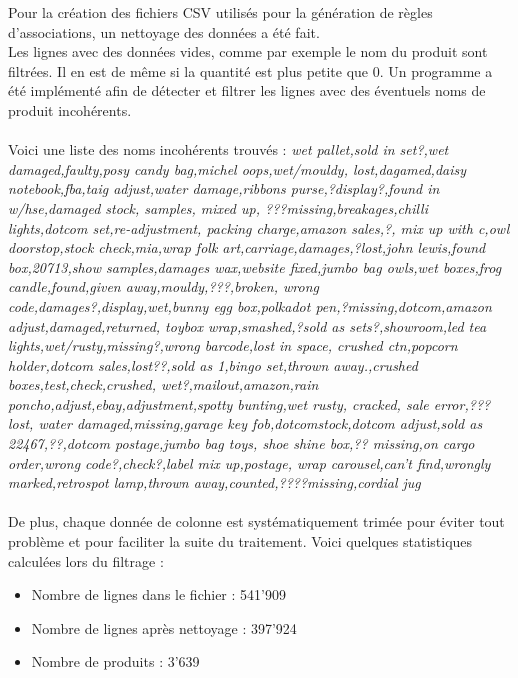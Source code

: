 \documentclass[a4paper]{article}
\begin{document}
\vspace{6pt}
Pour la création des fichiers CSV utilisés pour la génération de règles d'associations, un nettoyage des données a été fait.
\\
Les lignes avec des données vides, comme par exemple le nom du produit sont filtrées.
Il en est de même si la quantité est plus petite que 0.
Un programme a été implémenté afin de détecter et filtrer les lignes avec des éventuels noms de produit incohérents.
\\\\
Voici une liste des noms incohérents trouvés :
\textit{wet pallet,sold in set?,wet damaged,faulty,posy candy bag,michel oops,wet/mouldy,
lost,dagamed,daisy notebook,fba,taig adjust,water damage,ribbons purse,?display?,found in w/hse,damaged stock,
samples,
mixed up,
???missing,breakages,chilli lights,dotcom set,re-adjustment, packing charge,amazon sales,?,
mix up with c,owl doorstop,stock check,mia,wrap folk art,carriage,damages,?lost,john lewis,found box,20713,show samples,damages wax,website fixed,jumbo bag owls,wet boxes,frog candle,found,given away,mouldy,???,broken,
wrong code,damages?,display,wet,bunny egg box,polkadot pen,?missing,dotcom,amazon adjust,damaged,returned,
toybox  wrap,smashed,?sold as sets?,showroom,led tea lights,wet/rusty,missing?,wrong barcode,lost in space,
crushed ctn,popcorn holder,dotcom sales,lost??,sold as 1,bingo set,thrown away.,crushed boxes,test,check,crushed,
wet?,mailout,amazon,rain poncho,adjust,ebay,adjustment,spotty bunting,wet rusty,
cracked,
sale error,???lost,
water damaged,missing,garage key fob,dotcomstock,dotcom adjust,sold as 22467,??,dotcom postage,jumbo bag toys,
shoe shine box,?? missing,on cargo order,wrong code?,check?,label mix up,postage,
wrap carousel,can't find,wrongly marked,retrospot lamp,thrown away,counted,????missing,cordial jug}
\\\\
De plus, chaque donnée de colonne est systématiquement trimée pour éviter tout problème et pour faciliter la suite du traitement. 
Voici quelques statistiques calculées lors du filtrage :
\\

\begin{itemize}
	\item Nombre de lignes dans le fichier : 541'909
	\item Nombre de lignes après nettoyage : 397'924
	\item Nombre de produits : 3'639
\end{itemize}
\end{document}
